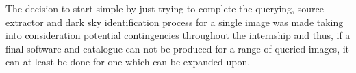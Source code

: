 \documentclass{article}
\begin{document}
The decision to start simple by just trying to complete the querying, source extractor and dark sky identification process for a single image was made taking into consideration potential contingencies throughout the internship and thus, if a final software and catalogue can not be produced for a range of queried images, it can at least be done for one which can be expanded upon. 
\end{document}
